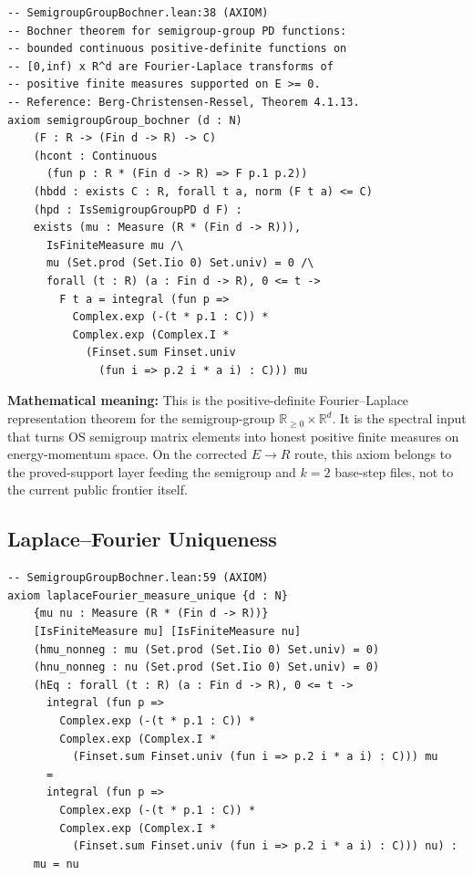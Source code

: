 \documentclass[11pt,a4paper]{article}
\begin{document}
\begin{lstlisting}[style=leanaxiom]
-- SemigroupGroupBochner.lean:38 (AXIOM)
-- Bochner theorem for semigroup-group PD functions:
-- bounded continuous positive-definite functions on
-- [0,inf) x R^d are Fourier-Laplace transforms of
-- positive finite measures supported on E >= 0.
-- Reference: Berg-Christensen-Ressel, Theorem 4.1.13.
axiom semigroupGroup_bochner (d : N)
    (F : R -> (Fin d -> R) -> C)
    (hcont : Continuous
      (fun p : R * (Fin d -> R) => F p.1 p.2))
    (hbdd : exists C : R, forall t a, norm (F t a) <= C)
    (hpd : IsSemigroupGroupPD d F) :
    exists (mu : Measure (R * (Fin d -> R))),
      IsFiniteMeasure mu /\
      mu (Set.prod (Set.Iio 0) Set.univ) = 0 /\
      forall (t : R) (a : Fin d -> R), 0 <= t ->
        F t a = integral (fun p =>
          Complex.exp (-(t * p.1 : C)) *
          Complex.exp (Complex.I *
            (Finset.sum Finset.univ
              (fun i => p.2 i * a i) : C))) mu
\end{lstlisting}

\noindent\textbf{Mathematical meaning:}
This is the positive-definite Fourier--Laplace representation theorem for the
semigroup-group $\mathbb{R}_{\ge 0} \times \mathbb{R}^d$. It is the spectral
input that turns OS semigroup matrix elements into honest positive finite
measures on energy-momentum space. On the corrected $E \to R$ route, this axiom
belongs to the proved-support layer feeding the semigroup and $k=2$ base-step
files, not to the current public frontier itself.

\subsection{Laplace--Fourier Uniqueness}

\begin{lstlisting}[style=leanaxiom]
-- SemigroupGroupBochner.lean:59 (AXIOM)
axiom laplaceFourier_measure_unique {d : N}
    {mu nu : Measure (R * (Fin d -> R))}
    [IsFiniteMeasure mu] [IsFiniteMeasure nu]
    (hmu_nonneg : mu (Set.prod (Set.Iio 0) Set.univ) = 0)
    (hnu_nonneg : nu (Set.prod (Set.Iio 0) Set.univ) = 0)
    (hEq : forall (t : R) (a : Fin d -> R), 0 <= t ->
      integral (fun p =>
        Complex.exp (-(t * p.1 : C)) *
        Complex.exp (Complex.I *
          (Finset.sum Finset.univ (fun i => p.2 i * a i) : C))) mu
      =
      integral (fun p =>
        Complex.exp (-(t * p.1 : C)) *
        Complex.exp (Complex.I *
          (Finset.sum Finset.univ (fun i => p.2 i * a i) : C))) nu) :
    mu = nu
\end{lstlisting}
\end{document}
